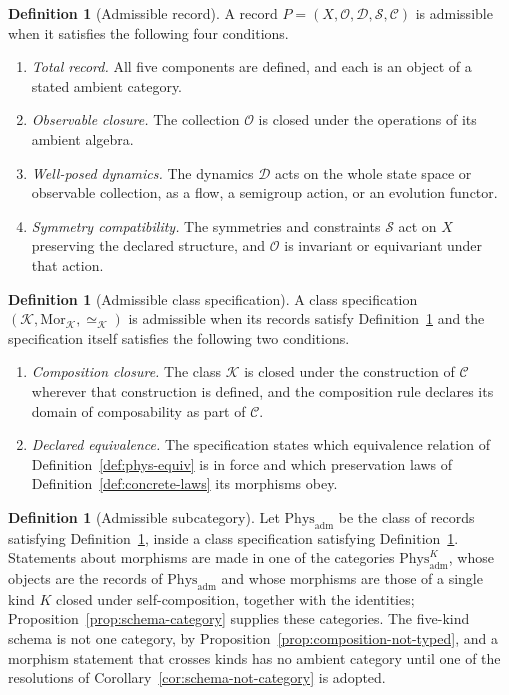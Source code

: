 \documentclass[11pt,letterpaper]{article}
\theoremstyle{definition}
\newtheorem{definition}[theorem]{Definition}
\theoremstyle{remark}
\begin{document}
\begin{definition}[Admissible record]
\label{def:admissibility}
A record $P = (X, \mathcal{O}, \mathcal{D}, \mathcal{S}, \mathcal{C})$ is admissible when it satisfies the following four conditions.
\begin{enumerate}[label=AC-\arabic*.,widest=AC-6.,leftmargin=*]
\item \emph{Total record.} All five components are defined, and each is an object of a stated ambient category.
\item \emph{Observable closure.} The collection $\mathcal{O}$ is closed under the operations of its ambient algebra.
\item \emph{Well-posed dynamics.} The dynamics $\mathcal{D}$ acts on the whole state space or observable collection, as a flow, a semigroup action, or an evolution functor.
\item \emph{Symmetry compatibility.} The symmetries and constraints $\mathcal{S}$ act on $X$ preserving the declared structure, and $\mathcal{O}$ is invariant or equivariant under that action.
\end{enumerate}
\end{definition}

\begin{definition}[Admissible class specification]
\label{def:admissible-spec}
A class specification $(\mathcal{K}, \mathrm{Mor}_{\mathcal{K}}, \simeq_{\mathcal{K}})$ is admissible when its records satisfy Definition~\ref{def:admissibility} and the specification itself satisfies the following two conditions.
\begin{enumerate}[label=AC-\arabic*.,widest=AC-6.,leftmargin=*,start=5]
\item \emph{Composition closure.} The class $\mathcal{K}$ is closed under the construction of $\mathcal{C}$ wherever that construction is defined, and the composition rule declares its domain of composability as part of $\mathcal{C}$.
\item \emph{Declared equivalence.} The specification states which equivalence relation of Definition~\ref{def:phys-equiv} is in force and which preservation laws of Definition~\ref{def:concrete-laws} its morphisms obey.
\end{enumerate}
\end{definition}

\begin{definition}[Admissible subcategory]
\label{def:phys-adm}
Let $\mathrm{Phys}_{\mathrm{adm}}$ be the class of records satisfying Definition~\ref{def:admissibility}, inside a class specification satisfying Definition~\ref{def:admissible-spec}. Statements about morphisms are made in one of the categories $\mathrm{Phys}^{K}_{\mathrm{adm}}$, whose objects are the records of $\mathrm{Phys}_{\mathrm{adm}}$ and whose morphisms are those of a single kind $K$ closed under self-composition, together with the identities; Proposition~\ref{prop:schema-category} supplies these categories. The five-kind schema is not one category, by Proposition~\ref{prop:composition-not-typed}, and a morphism statement that crosses kinds has no ambient category until one of the resolutions of Corollary~\ref{cor:schema-not-category} is adopted.
\end{definition}
\end{document}
